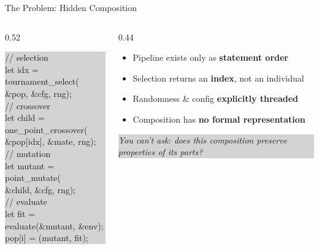 \documentclass[aspectratio=169,12pt]{beamer}
\begin{document}
\begin{frame}{The Problem: Hidden Composition}
\begin{columns}[T]
  \begin{column}{0.52\textwidth}
    \vspace{0.3em}
    \colorbox{lightgray}{\parbox{0.94\textwidth}{%
    \ttfamily\footnotesize\color{textgray}%
    \textcolor{redbad}{// selection}\\
    let idx = tournament\_select(\\
    \hspace{1em}\&pop, \&cfg, rng);\\[0.3em]
    \textcolor{redbad}{// crossover}\\
    let child = one\_point\_crossover(\\
    \hspace{1em}\&pop[idx], \&mate, rng);\\[0.3em]
    \textcolor{redbad}{// mutation}\\
    let mutant = point\_mutate(\\
    \hspace{1em}\&child, \&cfg, rng);\\[0.3em]
    \textcolor{redbad}{// evaluate}\\
    let fit = evaluate(\&mutant, \&env);\\
    pop[i] = (mutant, fit);
    }}
  \end{column}
  \begin{column}{0.44\textwidth}
    \vspace{1em}
    \begin{itemize}\setlength\itemsep{0.7em}
      \item Pipeline exists only as \textbf{statement order}
      \item Selection returns an \textbf{index}, not an individual
      \item Randomness \& config \textbf{explicitly threaded}
      \item Composition has \textbf{no formal representation}
    \end{itemize}
    \vspace{0.8em}
    \begin{center}
      \colorbox{lightgray}{\parbox{0.88\textwidth}{\centering
        \small\color{redbad}\textit{You can't ask: does this composition preserve properties of its parts?}
      }}
    \end{center}
  \end{column}
\end{columns}
\end{frame}
\end{document}

